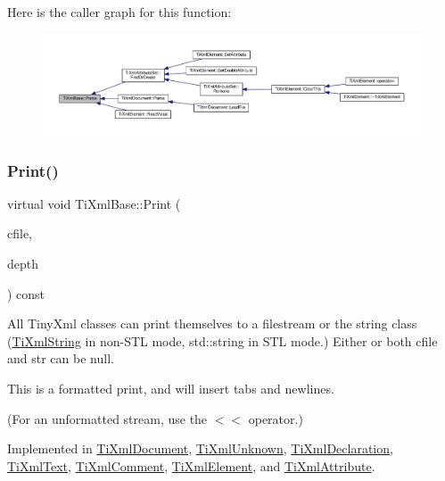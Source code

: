 Here is the caller graph for this function\+:\nopagebreak
\begin{figure}[H]
\begin{center}
\leavevmode
\includegraphics[width=350pt]{class_ti_xml_base_a00e4edb0219d00a1379c856e5a1d2025_icgraph}
\end{center}
\end{figure}
\mbox{\label{class_ti_xml_base_a0de56b3f2ef14c65091a3b916437b512}} 
\subsubsection{\texorpdfstring{Print()}{Print()}}
{\footnotesize\ttfamily virtual void Ti\+Xml\+Base\+::\+Print (\begin{DoxyParamCaption}\item[{F\+I\+LE $\ast$}]{cfile,  }\item[{int}]{depth }\end{DoxyParamCaption}) const\hspace{0.3cm}{\ttfamily [pure virtual]}}

All Tiny\+Xml classes can print themselves to a filestream or the string class (\hyperlink{class_ti_xml_string}{Ti\+Xml\+String} in non-\/\+S\+TL mode, std\+::string in S\+TL mode.) Either or both cfile and str can be null.

This is a formatted print, and will insert tabs and newlines.

(For an unformatted stream, use the $<$$<$ operator.) 

Implemented in \hyperlink{class_ti_xml_document_aa9e166fae51da603641380a964f21eeb}{Ti\+Xml\+Document}, \hyperlink{class_ti_xml_unknown_a5793fbc48ab3419783c0e866ca2d334e}{Ti\+Xml\+Unknown}, \hyperlink{class_ti_xml_declaration_ae46cff6565f299210ab945e78bf28514}{Ti\+Xml\+Declaration}, \hyperlink{class_ti_xml_text_a75f6895906333894e2574cc8cf77ea79}{Ti\+Xml\+Text}, \hyperlink{class_ti_xml_comment_a873171beac19d40f0eaae945711c98ed}{Ti\+Xml\+Comment}, \hyperlink{class_ti_xml_element_aa31a15cddfb8601a31236fe7d2569fb4}{Ti\+Xml\+Element}, and \hyperlink{class_ti_xml_attribute_a68ae373e03b9c35be4c9d0c3c233b894}{Ti\+Xml\+Attribute}.

